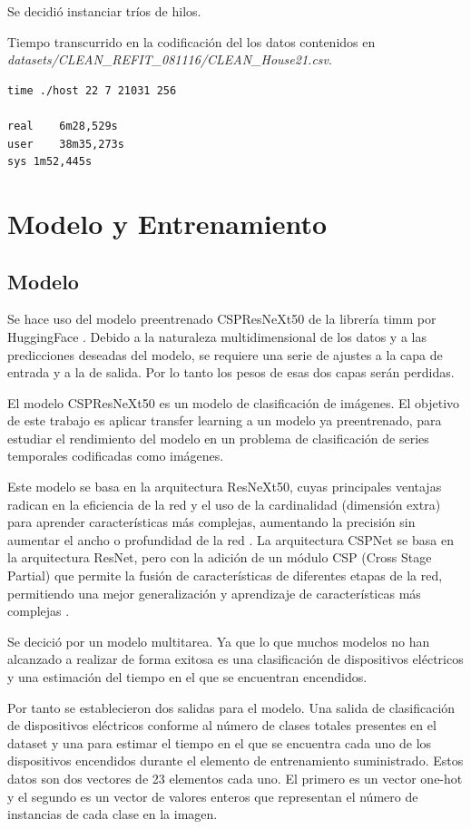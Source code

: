 Se decidió instanciar tríos de hilos. 

Tiempo transcurrido en la codificación del los datos contenidos en \\ \textit{datasets/CLEAN\_REFIT\_081116/CLEAN\_House21.csv}.
\begin{lstlisting}
time ./host 22 7 21031 256

real	6m28,529s
user	38m35,273s
sys	1m52,445s
\end{lstlisting}


\section{Modelo y Entrenamiento}
\subsection{Modelo}
Se hace uso del modelo preentrenado CSPResNeXt50 de la librería timm por HuggingFace \autocite{crunchbase2023huggingface}.
Debido a la naturaleza multidimensional de los datos y a las predicciones deseadas del modelo, se requiere una serie de ajustes a la capa de entrada y a la de salida. Por lo tanto los pesos de esas dos capas serán perdidas.

El modelo CSPResNeXt50 es un modelo de clasificación de imágenes. El objetivo de este trabajo es aplicar transfer learning a un modelo ya preentrenado, para estudiar el rendimiento del modelo en un problema de clasificación de series temporales codificadas como imágenes.

Este modelo se basa en la arquitectura ResNeXt50, cuyas principales ventajas radican en la eficiencia de la red y el uso de la cardinalidad (dimensión extra) para aprender características más complejas, aumentando la precisión sin aumentar el ancho o profundidad de la red \autocite{xie2017aggregated}.
La arquitectura CSPNet se basa en la arquitectura ResNet, pero con la adición de un módulo CSP (Cross Stage Partial) que permite la fusión de características de diferentes etapas de la red, permitiendo una mejor generalización y aprendizaje de características más complejas \autocite{wang2019cspnet}.

Se decició por un modelo multitarea. Ya que lo que muchos modelos no han alcanzado a realizar de forma exitosa es una clasificación de dispositivos eléctricos y una estimación del tiempo en el que se encuentran encendidos.

Por tanto se establecieron dos salidas para el modelo. Una salida de clasificación de dispositivos eléctricos conforme al número de clases totales presentes en el dataset y una  para estimar el tiempo en el que se encuentra cada uno de los dispositivos encendidos durante el elemento de entrenamiento suministrado.
Estos datos son dos vectores de 23 elementos cada uno. El primero es un vector one-hot y el segundo es un vector de valores enteros que representan el número de instancias de cada clase en la imagen.




